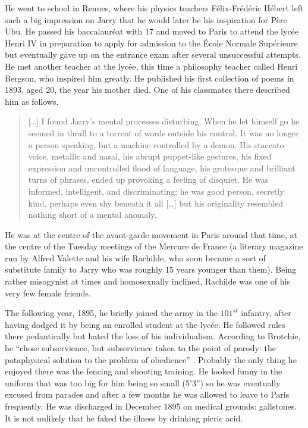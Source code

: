 He went to school in Rennes, where his physics teachers Félix-Frédéric Hébert left such a big impression on Jarry that he would later be his inspiration for Père Ubu. He passed his baccalauréat with 17 and moved to Paris to attend the lycée Henri IV in preparation to apply for admission to the École Normale Supérieure but eventually gave up on the entrance exam after several unsuccessful attempts. He met another teacher at the lycée, this time a philosophy teacher called Henri Bergson, who inspired him greatly. He published his first collection of poems in 1893, aged 20, the year his mother died. One of his classmates there described him as follows.

\begin{quotation}
  [\ldots] I found Jarry's mental processes disturbing. When he let himself go he seemed in thrall to a torrent of words outside his control. It was no longer a person speaking, but a machine controlled by a demon. His staccato voice, metallic and nasal, his abrupt puppet-like gestures, his fixed expression and uncontrolled flood of language, his grotesque and brilliant turns of phrases, ended up provoking a feeling of disquiet. He was informed, intelligent, and discriminating; he was good person, secretly kind, perhaps even shy beneath it all [\ldots] but his originality resembled nothing short of a mental anomaly. 
\end{quotation}

He was at the centre of the avant-garde movement in Paris around that time, at the centre of the Tuesday meetings of the Mercure de France (a literary magazine run by Alfred Valette and his wife Rachilde, who soon became a sort of substitute family to Jarry who was roughly 15 years younger than them). Being rather misogynist at times and homosexually inclined, Rachilde was one of his very few female friends.

The following year, 1895, he briefly joined the army in the $101^{st}$ infantry, after having dodged it by being an enrolled student at the lycée. He followed rules there pedantically but hated the loss of his individualism. According to Brotchie, he ``chose subservience, but subservience taken to the point of parody: the pataphysical solution to the problem of obedience'' \autocite*{Brotchie2011a}. Probably the only thing he enjoyed there was the fencing and shooting training. He looked funny in the uniform that was too big for him being so small (5'3'') so he was eventually excused from parades and after a few months he was allowed to leave to Paris frequently. He was discharged in December 1895 on medical grounds: gallstones. It is not unlikely that he faked the illness by drinking picric acid.

